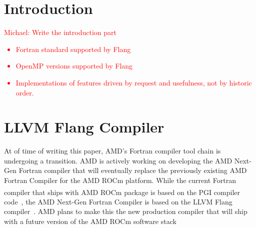 \documentclass[acmtog,natbib=false]{acmart}
\newcommand{\todo}[1]{\textcolor{red}{#1}}
\newcommand{\registered}[0]{\textsuperscript{\textregistered}\xspace}
\newcommand{\trademark}[0]{\texttrademark\xspace}
\begin{document}


\maketitle


\section{Introduction}
\label{sec:Introduction}
\todo{Michael: Write the introduction part}

\todo{
\begin{itemize}
\item Fortran standard supported by Flang
\item OpenMP versions supported by Flang
\item Implementations of features driven by request and usefulness, not by historic order.
\end{itemize}
}


\section{LLVM Flang Compiler}
\label{sec:LLVMFlangCompiler}

At of time of writing this paper, AMD's Fortran compiler tool chain is undergoing a transition.
AMD is actively working on developing the AMD Next-Gen Fortran compiler that will eventually replace the previously existing AMD Fortran Compiler for the AMD ROCm\trademark platform.
While the current Fortran compiler that ships with AMD ROCm\trademark package is based on the PGI\registered compiler code~\cite{Lara17,Pric17}, the AMD Next-Gen Fortran Compiler is based on the LLVM Flang compiler~\cite{LLVM25}.
AMD plans to make this the new production compiler that will ship with a future version of the AMD ROCm\trademark software stack
\end{document}
